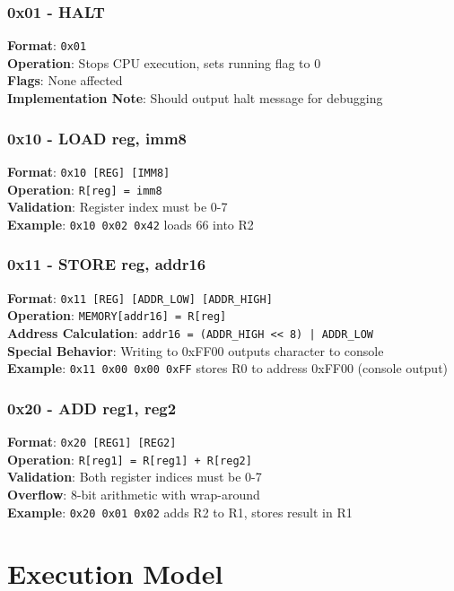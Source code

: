 \documentclass[a4paper,12pt]{article}
\begin{document}
\subsubsection{0x01 - HALT}
\textbf{Format}: \texttt{0x01}\\
\textbf{Operation}: Stops CPU execution, sets running flag to 0\\
\textbf{Flags}: None affected\\
\textbf{Implementation Note}: Should output halt message for debugging

\subsubsection{0x10 - LOAD reg, imm8}
\textbf{Format}: \texttt{0x10 [REG] [IMM8]}\\
\textbf{Operation}: \texttt{R[reg] = imm8}\\
\textbf{Validation}: Register index must be 0-7\\
\textbf{Example}: \texttt{0x10 0x02 0x42} loads 66 into R2

\subsubsection{0x11 - STORE reg, addr16}
\textbf{Format}: \texttt{0x11 [REG] [ADDR\_LOW] [ADDR\_HIGH]}\\
\textbf{Operation}: \texttt{MEMORY[addr16] = R[reg]}\\
\textbf{Address Calculation}: \texttt{addr16 = (ADDR\_HIGH << 8) | ADDR\_LOW}\\
\textbf{Special Behavior}: Writing to 0xFF00 outputs character to console\\
\textbf{Example}: \texttt{0x11 0x00 0x00 0xFF} stores R0 to address 0xFF00 (console output)

\subsubsection{0x20 - ADD reg1, reg2}
\textbf{Format}: \texttt{0x20 [REG1] [REG2]}\\
\textbf{Operation}: \texttt{R[reg1] = R[reg1] + R[reg2]}\\
\textbf{Validation}: Both register indices must be 0-7\\
\textbf{Overflow}: 8-bit arithmetic with wrap-around\\
\textbf{Example}: \texttt{0x20 0x01 0x02} adds R2 to R1, stores result in R1

\section{Execution Model}
\end{document}
